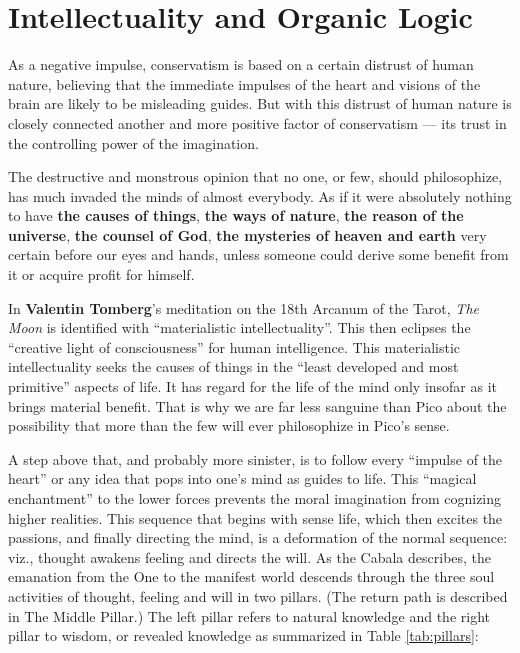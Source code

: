 \section{Intellectuality and Organic Logic}

\begin{quotex}
As a negative impulse, conservatism is based on a certain distrust of human nature, believing that the immediate impulses of the heart and visions of the brain are likely to be misleading guides. But with this distrust of human nature is closely connected another and more positive factor of conservatism --- its trust in the controlling power of the imagination.

The destructive and monstrous opinion that no one, or few, should philosophize, has much invaded the minds of almost everybody. As if it were absolutely nothing to have \textbf{the causes of things},
\textbf{the ways of nature}, \textbf{the reason of the universe}, \textbf{the counsel of God}, \textbf{the mysteries of heaven and earth} very certain before our eyes and hands, unless someone could derive some benefit from it or acquire profit for himself.
\end{quotex}


In \textbf{Valentin Tomberg}'s meditation on the 18th Arcanum of the Tarot, \emph{The Moon} is identified with ``materialistic intellectuality''. This then eclipses the ``creative light of consciousness'' for human intelligence. This materialistic intellectuality seeks the causes of things in the ``least developed and most primitive'' aspects of life. It has regard for the life of the mind only insofar as it brings material benefit. That is why we are far less sanguine than Pico about the possibility that more than the few will ever philosophize in Pico's sense.

A step above that, and probably more sinister, is to follow every ``impulse of the heart'' or any idea that pops into one's mind as guides to life. This ``magical enchantment'' to the lower forces prevents the moral imagination from cognizing higher realities. This sequence that begins with sense life, which then excites the passions, and finally directing the mind, is a deformation of the normal sequence: viz., thought awakens feeling and directs the will. As the Cabala describes, the emanation from the One to the manifest world descends through the three soul activities of thought, feeling and will in two pillars. (The return path is described in The Middle Pillar.) The left pillar refers to natural knowledge and the right pillar to wisdom, or revealed knowledge as summarized in Table \ref{tab:pillars}:

